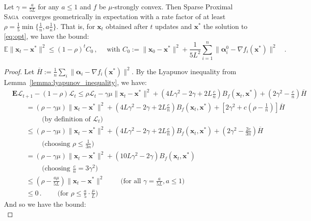 \documentclass{article}
\def\EE{{\mathbb E}}
\newcommand{\Econd}{\mathbf{E}}
\newcommand{\SAGA}{\textsc{Saga}}
\def\xx{{\boldsymbol x}}
\newenvironment{customtheorem}[1]
  {\renewcommand\theinnercustomtheorem{#1}\innercustomtheorem}
  {\endinnercustomtheorem}
\begin{document}
\begin{customtheorem}{1}
Let $\gamma = \frac{a}{5L}$ for any $a\leq 1$ and $f$ be $\mu$-strongly convex. Then Sparse Proximal \SAGA\ converges geometrically in expectation with a rate factor of at least $\rho = \frac{1}{5} \min\{\frac{1}{n}, a\frac{1}{\kappa}\}$. That is, for $\xx_t$ obtained after $t$ updates and $\xx^*$ the solution to \eqref{eq:opt}, we have the bound:
  $$
  \EE \|\xx_t - \xx^*\|^2 \leq (1-\rho)^t C_0\,,\quad \text{ with } C_0 :=  \|\xx_0 - \xx^*\|^2 + \textstyle\frac{1}{5 L^2} \sum_{i=1}^n\|{\boldsymbol\alpha}_i^0 - \nabla f_i(\xx^*)\|^2 \quad.
  $$
\end{customtheorem}
\begin{proof}
  Let $\overline{H} := \frac{1}{n}\sum_i \|{\boldsymbol\alpha}_i - \nabla f_i(\xx^*)\|^2$.
  By the Lyapunov inequality from Lemma~\ref{lemma:lyapunov_inequality}, we have:
\begin{align}
  &\Econd\mathcal{L}_{t+1} - (1 - \rho)\mathcal{L}_t \leq \rho \mathcal{L}_t - \gamma \mu\|\xx_t - \xx^*\|^2 +  \left(4 L \gamma^2 - 2 \gamma + 2L\frac{c}{n}\right)B_f(\xx_t, \xx^*) + \left(2\gamma^2 - \frac{c}{n} \right)\overline{H} \nonumber\\
  &\qquad=\left(\rho - \gamma \mu\right)\|\xx_t - \xx^*\|^2 +  \left(4 L \gamma^2 - 2 \gamma + 2L\frac{c}{n}\right)B_f(\xx_t, \xx^*) + \left[2\gamma^2 + c \left(\rho - \frac{1}{n}\right) \right]\overline{H} \nonumber\\
  &\qquad\qquad \text{ (by definition of $\mathcal{L}_t$)} \nonumber\\
  &\qquad\leq\left(\rho - \gamma \mu\right)\|\xx_t - \xx^*\|^2 +  \left(4 L \gamma^2 - 2 \gamma + 2L\frac{c}{n}\right)B_f(\xx_t, \xx^*) + \left(2\gamma^2 - \frac{2 c}{3 n} \right)\overline{H} \nonumber\\
  &\qquad\qquad\text{ (choosing $\rho \leq \frac{1}{3 n}$)}\nonumber\\
  &\qquad=\left(\rho - \gamma \mu\right)\|\xx_t - \xx^*\|^2 +  \left(10 L \gamma^2 - 2 \gamma \right)B_f(\xx_t, \xx^*) \nonumber\\
  &\qquad\qquad\text{ (choosing $\frac{c}{n} = 3 \gamma^2$)} \nonumber\\
  &\qquad\leq\left(\rho - \frac{a \mu}{5L} \right)\|\xx_t - \xx^*\|^2 \qquad\text{ (for all $\gamma = \frac{a}{5L}, a \leq 1$)} \nonumber\\
  &\qquad\leq0 \,.\qquad\text{ (for $\rho \leq \frac{a}{5} \cdot\frac{\mu}{L}$)}
\end{align}
And so we have the bound:
\begin{equation}

\end{equation}
\end{proof}
\end{document}
